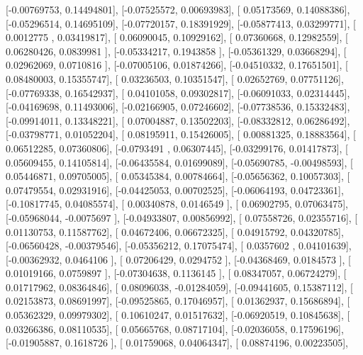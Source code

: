 \documentclass{article}
\begin{document}
       [-0.00769753,  0.14494801],
       [-0.07525572,  0.00693983],
       [ 0.05173569,  0.14088386],
       [-0.05296514,  0.14695109],
       [-0.07720157,  0.18391929],
       [-0.05877413,  0.03299771],
       [ 0.0012775 ,  0.03419817],
       [ 0.06090045,  0.10929162],
       [ 0.07360668,  0.12982559],
       [ 0.06280426,  0.0839981 ],
       [-0.05334217,  0.1943858 ],
       [-0.05361329,  0.03668294],
       [ 0.02962069,  0.0710816 ],
       [-0.07005106,  0.01874266],
       [-0.04510332,  0.17651501],
       [ 0.08480003,  0.15355747],
       [ 0.03236503,  0.10351547],
       [ 0.02652769,  0.07751126],
       [-0.07769338,  0.16542937],
       [ 0.04101058,  0.09302817],
       [-0.06091033,  0.02314445],
       [-0.04169698,  0.11493006],
       [-0.02166905,  0.07246602],
       [-0.07738536,  0.15332483],
       [-0.09914011,  0.13348221],
       [ 0.07004887,  0.13502203],
       [-0.08332812,  0.06286492],
       [-0.03798771,  0.01052204],
       [ 0.08195911,  0.15426005],
       [ 0.00881325,  0.18883564],
       [ 0.06512285,  0.07360806],
       [-0.0793491 ,  0.06307445],
       [-0.03299176,  0.01417873],
       [ 0.05609455,  0.14105814],
       [-0.06435584,  0.01699089],
       [-0.05690785, -0.00498593],
       [ 0.05446871,  0.09705005],
       [ 0.05345384,  0.00784664],
       [-0.05656362,  0.10057303],
       [ 0.07479554,  0.02931916],
       [-0.04425053,  0.00702525],
       [-0.06064193,  0.04723361],
       [-0.10817745,  0.04085574],
       [ 0.00340878,  0.0146549 ],
       [ 0.06902795,  0.07063475],
       [-0.05968044, -0.0075697 ],
       [-0.04933807,  0.00856992],
       [ 0.07558726,  0.02355716],
       [ 0.01130753,  0.11587762],
       [ 0.04672406,  0.06672325],
       [ 0.04915792,  0.04320785],
       [-0.06560428, -0.00379546],
       [-0.05356212,  0.17075474],
       [ 0.0357602 ,  0.04101639],
       [-0.00362932,  0.0464106 ],
       [ 0.07206429,  0.0294752 ],
       [-0.04368469,  0.0184573 ],
       [ 0.01019166,  0.0759897 ],
       [-0.07304638,  0.1136145 ],
       [ 0.08347057,  0.06724279],
       [ 0.01717962,  0.08364846],
       [ 0.08096038, -0.01284059],
       [-0.09441605,  0.15387112],
       [ 0.02153873,  0.08691997],
       [-0.09525865,  0.17046957],
       [ 0.01362937,  0.15686894],
       [ 0.05362329,  0.09979302],
       [ 0.10610247,  0.01517632],
       [-0.06920519,  0.10845638],
       [ 0.03266386,  0.08110535],
       [ 0.05665768,  0.08717104],
       [-0.02036058,  0.17596196],
       [-0.01905887,  0.1618726 ],
       [ 0.01759068,  0.04064347],
       [ 0.08874196,  0.00223505],
\end{document}
